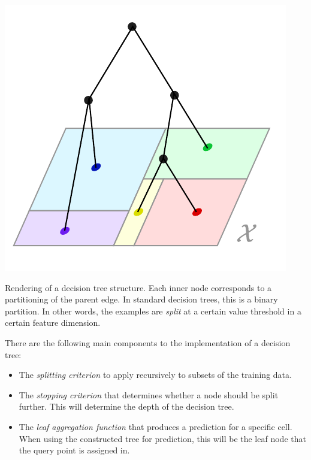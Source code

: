\documentclass[../main.tex]{subfiles}
\begin{document}

\begin{marginfigure}
    \label{fig:decision-tree-partition}
    \includegraphics[width=\textwidth]{figma-illustrations/decision-tree}
    \caption{
        Rendering of a decision tree structure. Each inner node corresponds to a partitioning of the parent edge. In standard decision trees, this is a binary partition. In other words, the examples are \textit{split} at a certain value threshold in a certain feature dimension.    }
\end{marginfigure}

    

There are the following main components to the implementation of a decision tree:
\begin{itemize}
    \item The \textit{splitting criterion} to apply recursively to subsets of the training data.
    \item The \textit{stopping criterion} that determines whether a node should be split further. This will determine the depth of the decision tree.
    \item The \textit{leaf aggregation function} that produces a prediction for a specific cell. When using the constructed tree for prediction, this will be the leaf node that the query point is assigned in.
\end{itemize}
\end{document}
